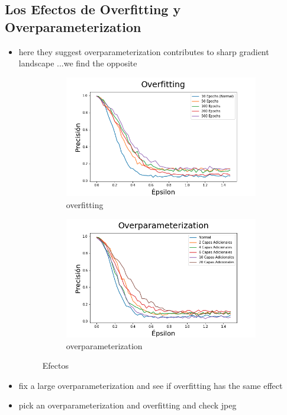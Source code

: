 \subsection{Los Efectos de Overfitting y Overparameterization}
\begin{itemize}
    \item here they suggest overparameterization contributes to sharp gradient landscape \cite{ma2020understanding}...we find the opposite
    \begin{figure}[h]
        \centering
        \begin{subfigure}[b]{0.49\textwidth}
            \centering
            \includegraphics[width=\textwidth]{images/overfit_vs_attack.png}
            \caption{overfitting}
            \label{overfit}
        \end{subfigure}
        \begin{subfigure}[b]{0.49\textwidth}
            \centering
            \includegraphics[width=\textwidth]{images/overparam_vs_attack.png}
            \caption{overparameterization}
            \label{mnist2}
        \end{subfigure}
        \caption{Efectos}
        \label{overparam}
    \end{figure}
    
    \item fix a large overparameterization and see if overfitting has the same effect
    \item pick an overparameterization and overfitting and check jpeg

\end{itemize}
